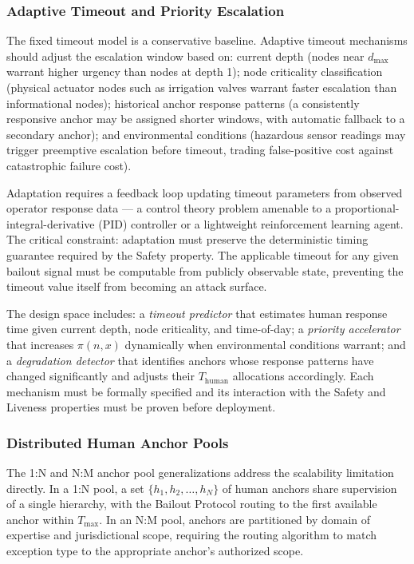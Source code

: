 \subsubsection{Adaptive Timeout and Priority Escalation}
\label{sec:fw-adaptive-timeout}

The fixed timeout model is a conservative baseline. Adaptive timeout mechanisms should adjust the escalation window based on: current depth (nodes near $d_{\max}$ warrant higher urgency than nodes at depth 1); node criticality classification (physical actuator nodes such as irrigation valves warrant faster escalation than informational nodes); historical anchor response patterns (a consistently responsive anchor may be assigned shorter windows, with automatic fallback to a secondary anchor); and environmental conditions (hazardous sensor readings may trigger preemptive escalation before timeout, trading false-positive cost against catastrophic failure cost).

Adaptation requires a feedback loop updating timeout parameters from observed operator response data --- a control theory problem amenable to a proportional-integral-derivative (PID) controller or a lightweight reinforcement learning agent. The critical constraint: adaptation must preserve the deterministic timing guarantee required by the Safety property. The applicable timeout for any given bailout signal must be computable from publicly observable state, preventing the timeout value itself from becoming an attack surface.

The design space includes: a \emph{timeout predictor} that estimates human response time given current depth, node criticality, and time-of-day; a \emph{priority accelerator} that increases $\pi(n, x)$ dynamically when environmental conditions warrant; and a \emph{degradation detector} that identifies anchors whose response patterns have changed significantly and adjusts their $T_{\text{human}}$ allocations accordingly. Each mechanism must be formally specified and its interaction with the Safety and Liveness properties must be proven before deployment.

\subsubsection{Distributed Human Anchor Pools}
\label{sec:fw-anchor-pools}

The 1:N and N:M anchor pool generalizations address the scalability limitation directly. In a 1:N pool, a set $\{h_1, h_2, \dots, h_N\}$ of human anchors share supervision of a single hierarchy, with the Bailout Protocol routing to the first available anchor within $T_{\max}$. In an N:M pool, anchors are partitioned by domain of expertise and jurisdictional scope, requiring the routing algorithm to match exception type to the appropriate anchor's authorized scope.

